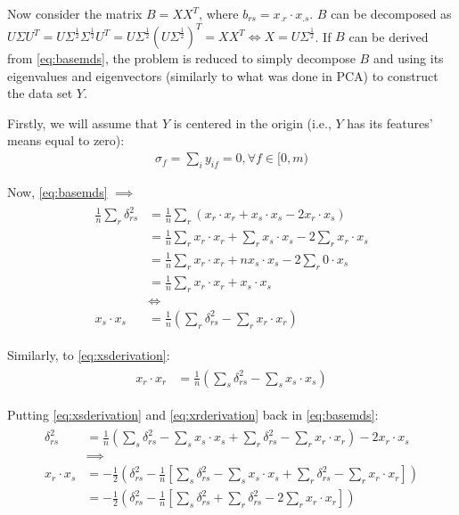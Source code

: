 \documentclass[12pt]{report}
\begin{document}
Now consider the matrix $B=XX^T$, where $b_{rs}=x_{.r}\cdot x_{.s}$. $B$ can be decomposed as $U\Sigma U^T=U\Sigma^\frac{1}{2} \Sigma^\frac{1}{2} U^T=U\Sigma^\frac{1}{2} (U\Sigma^\frac{1}{2})^T = XX^T\iff X=U\Sigma^\frac{1}{2}$. If $B$ can be derived from \ref{eq:basemds}, the problem is reduced to simply decompose $B$ and using its eigenvalues and eigenvectors (similarly to what was done in PCA) to construct the data set $Y$. \cite{cox2001}

Firstly, we will assume that $Y$ is centered in the origin (i.e., $Y$ has its features' means equal to zero):
\begin{align}
\sigma_f = \sum_i y_{if} = 0, \forall f\in [0, m)
\end{align}

Now, \ref{eq:basemds} $\implies$
\begin{align}
\label{eq:xsderivation}
\begin{split}
\frac{1}{n} \sum_r \delta_{rs}^2
&= \frac{1}{n} \sum_r (x_r\cdot x_r + x_s\cdot x_s -2x_r\cdot x_s) \\
&= \frac{1}{n} \sum_r x_r\cdot x_r + \sum_r x_s\cdot x_s -2 \sum_r x_r\cdot x_s \\
&= \frac{1}{n} \sum_r x_r\cdot x_r + nx_s\cdot x_s -2 \sum_r 0\cdot x_s \\
&= \frac{1}{n} \sum_r x_r\cdot x_r + x_s\cdot x_s \\
&\iff \\
x_s\cdot x_s &= \frac{1}{n} (\sum_r \delta_{rs}^2 - \sum_r x_r\cdot x_r)
\end{split}
\end{align}

Similarly, to \ref{eq:xsderivation}:
\begin{align}
\label{eq:xrderivation}
\begin{split}
x_r\cdot x_r &= \frac{1}{n} (\sum_s \delta_{rs}^2 - \sum_s x_s\cdot x_s)
\end{split}
\end{align}

Putting \ref{eq:xsderivation} and \ref{eq:xrderivation} back in \ref{eq:basemds}:
\begin{align}
\label{eq:xrsderivation}
\begin{split}
\delta_{rs}^2 &= \frac{1}{n} (\sum_s \delta_{rs}^2 - \sum_s x_s\cdot x_s + \sum_r \delta_{rs}^2 - \sum_r x_r\cdot x_r) -2x_r\cdot x_s \\
&\implies \\
x_r\cdot x_s &= -\frac{1}{2} (\delta_{rs}^2 - \frac{1}{n} [\sum_s \delta_{rs}^2 - \sum_s x_s\cdot x_s + \sum_r \delta_{rs}^2 - \sum_r x_r\cdot x_r])\\
&= -\frac{1}{2} (\delta_{rs}^2 - \frac{1}{n} [\sum_s \delta_{rs}^2 + \sum_r \delta_{rs}^2 - 2\sum_r x_r\cdot x_r])\\
\end{split}
\end{align}
\end{document}
